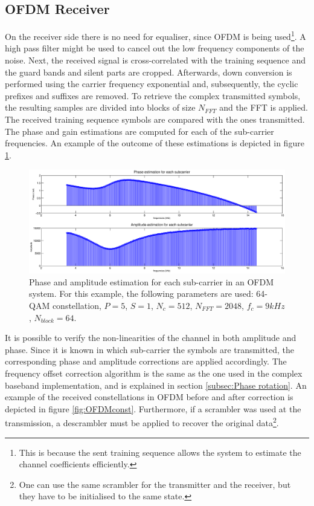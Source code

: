 \documentclass[12pt,a4paper,openright]{report}
\begin{document}
\subsection{OFDM Receiver}
On the receiver side there is no need for equaliser, since OFDM is being used\footnote{This is because the sent training sequence allows the system to estimate the channel coefficients efficiently.}. A high pass filter might be used to cancel out the low frequency components of the noise. Next, the received signal is cross-correlated with the training sequence and the guard bands and silent parts are cropped. Afterwards, down conversion is performed using the carrier frequency exponential and, subsequently, the cyclic prefixes and suffixes are removed. To retrieve the complex transmitted symbols, the resulting samples are divided into blocks of size $N_{FFT}$ and the FFT is applied. The received training sequence symbols are compared with the ones transmitted. The phase and gain estimations are computed for each of the sub-carrier frequencies. An example of the outcome of these estimations is depicted in figure \ref{fig:OFDMphase-amp}. 

\begin{figure}[h]
  \centering
    \includegraphics[width=1\textwidth]{OFDMchannelestim.eps}
    \caption[Phase and amplitude estimation for each sub-carrier in an OFDM system.]{Phase and amplitude estimation for each sub-carrier in an OFDM system. For this example, the following parameters are used: 64-QAM constellation, $P=5$, $S=1$, $N_c=512$, $N_{FFT}=2048$, $f_c = 9 kHz$, $N_{block}=64$.
    }
    \label{fig:OFDMphase-amp}
\end{figure}


It is possible to verify the non-linearities of the channel in both amplitude and phase. Since it is known in which sub-carrier the symbols are transmitted, the corresponding phase and amplitude corrections are applied accordingly. The frequency offset correction algorithm is the same as the one used in the complex baseband implementation, and is explained in section \ref{subsec:Phase rotation}. An example of the received constellations in OFDM before and after correction is depicted in figure \ref{fig:OFDMconst}. Furthermore, if a scrambler was used at the transmission, a descrambler must be applied to recover the original data\footnote{One can use the same scrambler for the transmitter and the receiver, but they have to be initialised to the same state.}.
\end{document}
